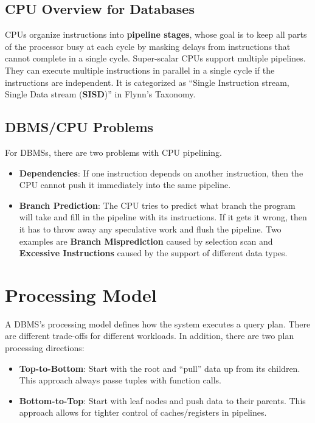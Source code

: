 \documentclass[11pt]{article}
\begin{document}
\subsection*{CPU Overview for Databases}
CPUs organize instructions into \textbf{pipeline stages}, whose goal is to keep all parts of the 
processor busy at each cycle by masking delays from instructions that cannot complete in a single 
cycle. Super-scalar CPUs support multiple pipelines. They can execute multiple instructions in 
parallel in a single cycle if the instructions are independent. It is categorized as ``Single 
Instruction stream, Single Data stream (\textbf{SISD})'' in Flynn's Taxonomy.

\subsection*{DBMS/CPU Problems}
For DBMSs, there are two problems with CPU pipelining. 

\begin{itemize}
	\item \textbf{Dependencies}: 
	If one instruction depends on another instruction, 
	then the CPU cannot push it immediately into the same pipeline. 
	
	\item \textbf{Branch Prediction}: 
	The CPU tries to predict what branch the program will take and fill in the pipeline with its 
	instructions. If it gets it wrong, then it has to throw away any speculative work and flush the 
	pipeline. Two examples are \textbf{Branch Misprediction} caused by selection scan and 
	\textbf{Excessive Instructions} caused by the support of different data types.
\end{itemize}

\section{Processing Model}
A DBMS's processing model defines how the system executes a query plan. There are different 
trade-offs for different workloads. In addition, there are two plan processing directions:
\begin{itemize}
	\item \textbf{Top-to-Bottom}: 
	Start with the root and ``pull'' data up from its children. 
	This approach always passe tuples with function calls.
	\item \textbf{Bottom-to-Top}: 
	Start with leaf nodes and push data to their parents. 
	This approach allows for tighter control of caches/registers in pipelines.
\end{itemize} 
\end{document}
